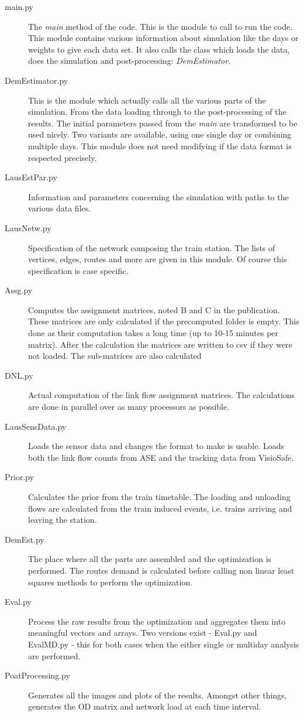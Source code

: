 \documentclass[a4paper,12pt]{article}
\begin{document}
\begin{description}
\item[main.py] The \textit{main} method of the code. This is the module to call to run the code. This module contains various information about simulation like the days or weights to give each data set. It also calls the class which loads the data, does the simulation and post-processing: \textit{DemEstimator}.
\item[DemEstimator.py] This is the module which actually calls all the various parts of the simulation. From the data loading through to the post-processing of the results. The initial parameters passed from the \textit{main} are transformed to be used nicely. Two variants are available, using one single day or combining multiple days. This module does not need modifying if the data format is respected precisely.
\item[LausEstPar.py] Information and parameters concerning the simulation with paths to the various data files.
\item[LausNetw.py] Specification of the network composing the train station. The lists of vertices, edges, routes and more are given in this module. Of course this specification is case specific.
\item[Assg.py] Computes the assignment matrices, noted B and C in the publication. These matrices are only calculated if the precomputed folder is empty. This done as their computation takes a long time (up to 10-15 minutes per matrix). After the calculation the matrices are written to csv if they were not loaded. The sub-matrices are also calculated
\item[DNL.py] Actual computation of the link flow assignment matrices. The calculations are done in parallel over as many processors as possible.
\item[LausSensData.py] Loads the sensor data and changes the format to make is usable. Loads both the link flow counts from ASE and the tracking data from VisioSafe.
\item [Prior.py] Calculates the prior from the train timetable. The loading and unloading flows are calculated from the train induced events, i.e. trains arriving and leaving the station.
\item[DemEst.py] The place where all the parts are assembled and the optimization is performed. The routes demand is calculated before calling non linear least squares methods to perform the optimization.
\item[Eval.py] Process the raw results from the optimization and aggregates them into meaningful vectors and arrays. Two versions exist - Eval.py and EvalMD.py - this for both cases when the either single or multiday analysis are performed.
  \item[PoatProcessing.py] Generates all the images and plots of the results. Amongst other things, generates the OD matrix and network load at each time interval. 
\end{description} 
\end{document}
